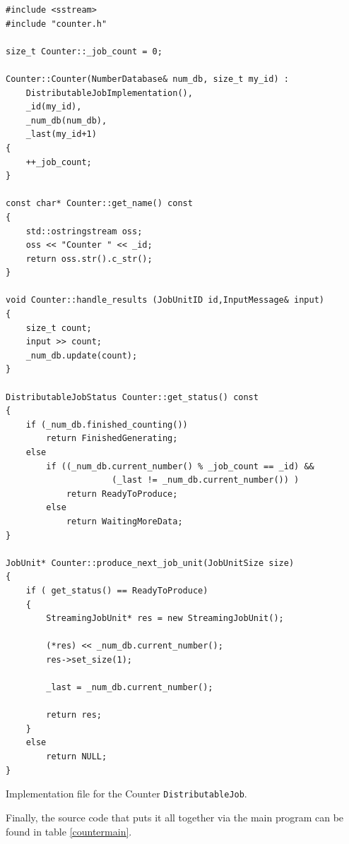 \documentclass[a4paper,12pt,english]{article}
\renewcommand{\DJ}{\texttt{DistributableJob}}
\begin{document}
\begin{table}[!htb]
\lstset{language=C++}
\begin{lstlisting}[frame=single]
#include <sstream>
#include "counter.h"

size_t Counter::_job_count = 0;

Counter::Counter(NumberDatabase& num_db, size_t my_id) :
    DistributableJobImplementation(),
    _id(my_id),
    _num_db(num_db),
    _last(my_id+1)
{
    ++_job_count;
}

const char* Counter::get_name() const
{
    std::ostringstream oss;
    oss << "Counter " << _id;
    return oss.str().c_str();
}

void Counter::handle_results (JobUnitID id,InputMessage& input)
{
    size_t count;
    input >> count;
    _num_db.update(count);
}

DistributableJobStatus Counter::get_status() const
{
    if (_num_db.finished_counting())
        return FinishedGenerating;
    else
        if ((_num_db.current_number() % _job_count == _id) &&
                     (_last != _num_db.current_number()) )
            return ReadyToProduce;
        else
            return WaitingMoreData;
}

JobUnit* Counter::produce_next_job_unit(JobUnitSize size)
{
    if ( get_status() == ReadyToProduce)
    {
        StreamingJobUnit* res = new StreamingJobUnit();

        (*res) << _num_db.current_number();
        res->set_size(1);

        _last = _num_db.current_number();

        return res;
    }
    else
        return NULL;
}
\end{lstlisting}
\centering \caption{Implementation file for the Counter \DJ.} \label{countersrc}
\end{table}

Finally, the source code that puts it all together via the main program can be found in table \ref{countermain}.
\end{document}
